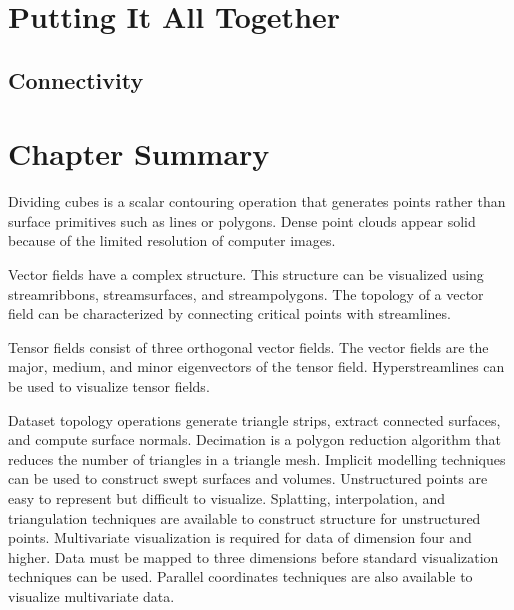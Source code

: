 \section{Putting It All Together}

\subsection{Connectivity}
\label{subsec:connectivity}

\section{Chapter Summary}

Dividing cubes is a scalar contouring operation that generates points rather than surface primitives such as lines or polygons. Dense point clouds appear solid because of the limited resolution of computer images.

Vector fields have a complex structure. This structure can be visualized using streamribbons, streamsurfaces, and streampolygons. The topology of a vector field can be characterized by connecting critical points with streamlines.

Tensor fields consist of three orthogonal vector fields. The vector fields are the major, medium, and minor eigenvectors of the tensor field. Hyperstreamlines can be used to visualize tensor fields.

Dataset topology operations generate triangle strips, extract connected surfaces, and compute surface normals. Decimation is a polygon reduction algorithm that reduces the number of triangles in a triangle mesh. Implicit modelling techniques can be used to construct swept surfaces and volumes. Unstructured points are easy to represent but difficult to visualize. Splatting, interpolation, and triangulation techniques are available to construct structure for unstructured points. Multivariate visualization is required for data of dimension four and higher. Data must be mapped to three dimensions before standard visualization techniques can be used. Parallel coordinates techniques are also available to visualize multivariate data.


